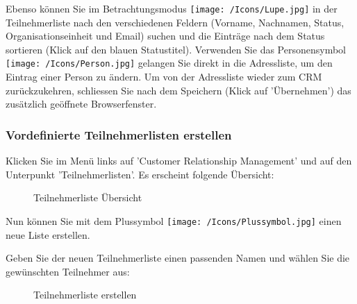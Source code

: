 Ebenso können Sie im Betrachtungsmodus \texttt{[image: /Icons/Lupe.jpg]} in der Teilnehmerliste nach den verschiedenen Feldern (Vorname, Nachnamen, Status, Organisationseinheit und Email) suchen  und die Einträge nach dem Status sortieren  (Klick auf den blauen Statustitel). Verwenden Sie das Personensymbol \texttt{[image: /Icons/Person.jpg]}  gelangen Sie direkt in die Adressliste, um den Eintrag einer Person zu ändern. Um von der Adressliste wieder zum CRM zurückzukehren, schliessen Sie nach dem Speichern (Klick auf 'Übernehmen') das zusätzlich geöffnete Browserfenster.


\pagebreak
\subsubsection{Vordefinierte Teilnehmerlisten erstellen}
\label{bkm:Ref2018072301}

Klicken Sie im Menü links auf 'Customer Relationship Management' und auf den Unterpunkt 'Teilnehmerlisten'. Es erscheint folgende Übersicht:

\begin{figure}[H]
\caption{Teilnehmerliste Übersicht}
\end{figure}

Nun können Sie mit dem Plussymbol \texttt{[image: /Icons/Plussymbol.jpg]}  einen neue Liste erstellen. 

\vspace{\baselineskip}

Geben Sie der neuen Teilnehmerliste einen passenden Namen und wählen Sie die gewünschten Teilnehmer aus:

\begin{figure}[H]
\caption{Teilnehmerliste erstellen}
\end{figure}

